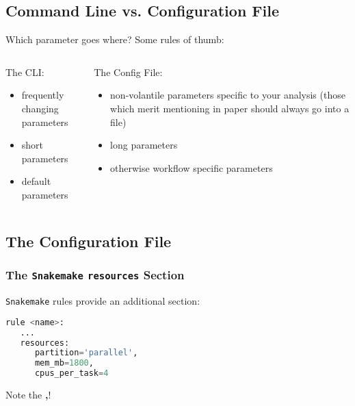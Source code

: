 \subsection{Command Line vs. Configuration File}

\begin{frame}
  \pause
  \begin{exampleblock}{Which parameter goes where? Some rules of thumb:}
    \begin{columns}[t]
      \begin{column}{0.5\textwidth}
        The CLI:
        \begin{itemize}
         \item frequently changing parameters
         \item short parameters
         \item default parameters
        \end{itemize}
      \end{column}
      \begin{column}{0.5\textwidth}
        The Config File:
        \begin{itemize}
         \item non-volantile parameters specific to your analysis (those which merit mentioning in paper should always go into a file)
         \item long parameters
         \item otherwise workflow specific parameters
        \end{itemize}
      \end{column}
    \end{columns}
  \end{exampleblock}
\end{frame}

\subsection{The Configuration File}

\begin{frame}[fragile]
  \frametitle{The \texttt{Snakemake} \texttt{resources} Section}
  \texttt{Snakemake} rules provide an additional  section:
  \begin{lstlisting}[language=Python,style=Python]
rule <name>:
   ...
   resources:
      partition='parallel',
      mem_mb=1800,
      cpus_per_task=4
  \end{lstlisting}
  \begin{hint}
  	Note the \textbf{,}!
  \end{hint}
  \pause
\end{frame}

